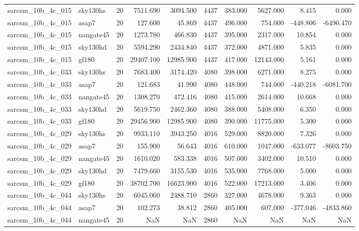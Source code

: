 \begin{longtable}{llrrrrrrrr}
sarcsm\_10b\_4c\_015 & sky130hs & 20 & 7511.690 & 3094.500 & 4437 & 383.000 & 5627.000 & 8.415 & 0.000 \\
sarcsm\_10b\_4c\_015 & asap7 & 20 & 127.600 & 45.869 & 4437 & 496.000 & 754.000 & -448.806 & -6490.470 \\
sarcsm\_10b\_4c\_015 & nangate45 & 20 & 1273.780 & 466.830 & 4437 & 395.000 & 2317.000 & 10.854 & 0.000 \\
sarcsm\_10b\_4c\_015 & sky130hd & 20 & 5594.290 & 2434.840 & 4437 & 372.000 & 4871.000 & 5.835 & 0.000 \\
sarcsm\_10b\_4c\_015 & gf180 & 20 & 29407.100 & 12985.900 & 4437 & 417.000 & 12143.000 & 5.161 & 0.000 \\
sarcsm\_10b\_4c\_033 & sky130hs & 20 & 7683.400 & 3174.420 & 4080 & 398.000 & 6271.000 & 8.275 & 0.000 \\
sarcsm\_10b\_4c\_033 & asap7 & 20 & 121.683 & 41.990 & 4080 & 448.000 & 744.000 & -440.218 & -6081.700 \\
sarcsm\_10b\_4c\_033 & nangate45 & 20 & 1308.270 & 472.416 & 4080 & 415.000 & 2614.000 & 10.668 & 0.000 \\
sarcsm\_10b\_4c\_033 & sky130hd & 20 & 5619.750 & 2462.360 & 4080 & 388.000 & 5408.000 & 6.350 & 0.000 \\
sarcsm\_10b\_4c\_033 & gf180 & 20 & 29456.900 & 12985.900 & 4080 & 390.000 & 11775.000 & 5.300 & 0.000 \\
sarcsm\_10b\_4c\_029 & sky130hs & 20 & 9933.110 & 3943.250 & 4016 & 529.000 & 8820.000 & 7.326 & 0.000 \\
sarcsm\_10b\_4c\_029 & asap7 & 20 & 155.900 & 56.643 & 4016 & 610.000 & 1047.000 & -633.077 & -8603.750 \\
sarcsm\_10b\_4c\_029 & nangate45 & 20 & 1610.020 & 583.338 & 4016 & 507.000 & 3402.000 & 10.510 & 0.000 \\
sarcsm\_10b\_4c\_029 & sky130hd & 20 & 7479.660 & 3155.530 & 4016 & 535.000 & 7768.000 & 5.000 & 0.000 \\
sarcsm\_10b\_4c\_029 & gf180 & 20 & 38702.700 & 16623.900 & 4016 & 522.000 & 17213.000 & 3.406 & 0.000 \\
sarcsm\_10b\_4c\_044 & sky130hs & 20 & 6045.060 & 2488.710 & 2860 & 327.000 & 4678.000 & 9.363 & 0.000 \\
sarcsm\_10b\_4c\_044 & asap7 & 20 & 102.273 & 38.812 & 2860 & 405.000 & 607.000 & -377.046 & -4833.860 \\
sarcsm\_10b\_4c\_044 & nangate45 & 20 & NaN & NaN & 2860 & NaN & NaN & NaN & NaN \\

\end{longtable}
